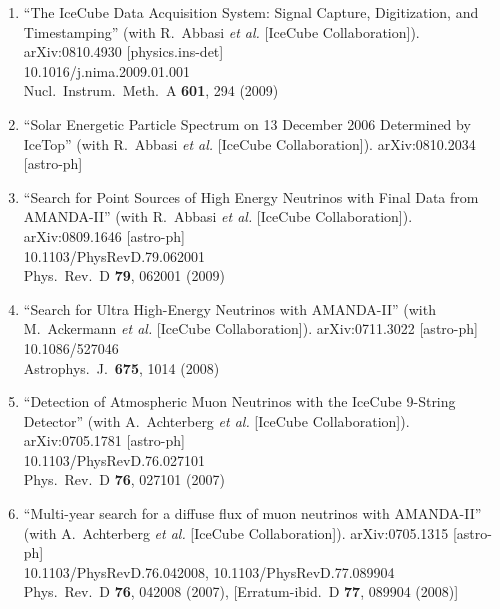 \begin{enumerate}
\item ``The IceCube Data Acquisition System: Signal Capture, Digitization,
  and Timestamping'' (with R.~Abbasi {\it et al.}  [IceCube
    Collaboration]).  \\{}arXiv:0810.4930 [physics.ins-det]
  \\{}10.1016/j.nima.2009.01.001 \\{}Nucl.\ Instrum.\ Meth.\ A {\bf
    601}, 294 (2009) %


\item ``Solar Energetic Particle Spectrum on 13 December 2006 Determined by
  IceTop'' (with R.~Abbasi {\it et al.}  [IceCube Collaboration]). arXiv:0810.2034 [astro-ph]
  


\item ``Search for Point Sources of High Energy Neutrinos with Final Data
  from AMANDA-II'' (with R.~Abbasi {\it et al.}  [IceCube
    Collaboration]).  \\{}arXiv:0809.1646 [astro-ph]
  \\{}10.1103/PhysRevD.79.062001 \\{}Phys.\ Rev.\ D {\bf 79}, 062001
  (2009) %


\item ``Search for Ultra High-Energy Neutrinos with AMANDA-II'' (with M.~Ackermann {\it et al.}  [IceCube Collaboration]). arXiv:0711.3022 [astro-ph] \\{}10.1086/527046
  \\{}Astrophys.\ J.\ {\bf 675}, 1014 (2008) %


\item ``Detection of Atmospheric Muon Neutrinos with the IceCube 9-String
  Detector'' (with A.~Achterberg {\it et al.}  [IceCube Collaboration]). arXiv:0705.1781 [astro-ph] \\{}10.1103/PhysRevD.76.027101
  \\{}Phys.\ Rev.\ D {\bf 76}, 027101 (2007) %


\item ``Multi-year search for a diffuse flux of muon neutrinos with
  AMANDA-II'' (with A.~Achterberg {\it et al.}  [IceCube Collaboration]). arXiv:0705.1315 [astro-ph] \\{}10.1103/PhysRevD.76.042008,
  10.1103/PhysRevD.77.089904 \\{}Phys.\ Rev.\ D {\bf 76}, 042008
  (2007), [Erratum-ibid.\ D {\bf 77}, 089904 (2008)] %



\end{enumerate}
